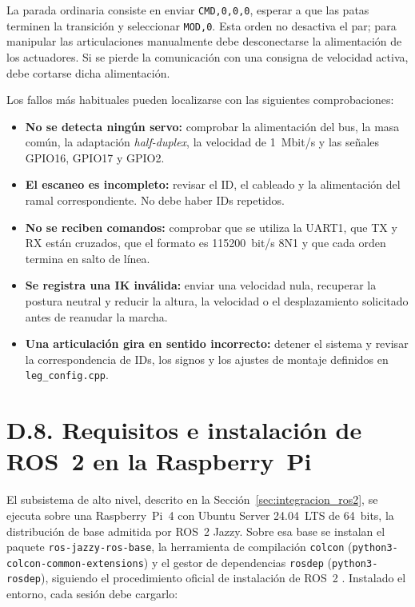 La parada ordinaria consiste en enviar \texttt{CMD,0,0,0}, esperar a que las
patas terminen la transición y seleccionar \texttt{MOD,0}. Esta orden no
desactiva el par; para manipular las articulaciones manualmente debe
desconectarse la alimentación de los actuadores. Si se pierde la comunicación
con una consigna de velocidad activa, debe cortarse dicha alimentación.

Los fallos más habituales pueden localizarse con las siguientes comprobaciones:

\begin{itemize}[leftmargin=*,nosep]
    \small
    \item \textbf{No se detecta ningún servo:} comprobar la alimentación del
          bus, la masa común, la adaptación \textit{half-duplex}, la velocidad
          de 1~Mbit/s y las señales GPIO16, GPIO17 y GPIO2.
    \item \textbf{El escaneo es incompleto:} revisar el ID, el cableado y la
          alimentación del ramal correspondiente. No debe haber IDs repetidos.
    \item \textbf{No se reciben comandos:} comprobar que se utiliza la UART1,
          que TX y RX están cruzados, que el formato es 115200~bit/s 8N1 y que
          cada orden termina en salto de línea.
    \item \textbf{Se registra una IK inválida:} enviar una velocidad nula,
          recuperar la postura neutral y reducir la altura, la velocidad o el
          desplazamiento solicitado antes de reanudar la marcha.
    \item \textbf{Una articulación gira en sentido incorrecto:} detener el
          sistema y revisar la correspondencia de IDs, los signos y los ajustes
          de montaje definidos en \texttt{leg\_config.cpp}.
\end{itemize}

\section*{D.8. Requisitos e instalación de ROS~2 en la Raspberry~Pi}

El subsistema de alto nivel, descrito en la Sección~\ref{sec:integracion_ros2}, se
ejecuta sobre una Raspberry~Pi~4 \cite{raspberrypi4_datasheet} con Ubuntu Server
24.04~LTS de 64~bits, la distribución de base admitida por ROS~2 Jazzy. Sobre esa
base se instalan el paquete \texttt{ros-jazzy-ros-base}, la herramienta de
compilación \texttt{colcon} (\texttt{python3-colcon-common-extensions}) y el
gestor de dependencias \texttt{rosdep} (\texttt{python3-rosdep}), siguiendo el
procedimiento oficial de instalación de ROS~2 \cite{ros2_docs}. Instalado el
entorno, cada sesión debe cargarlo:

